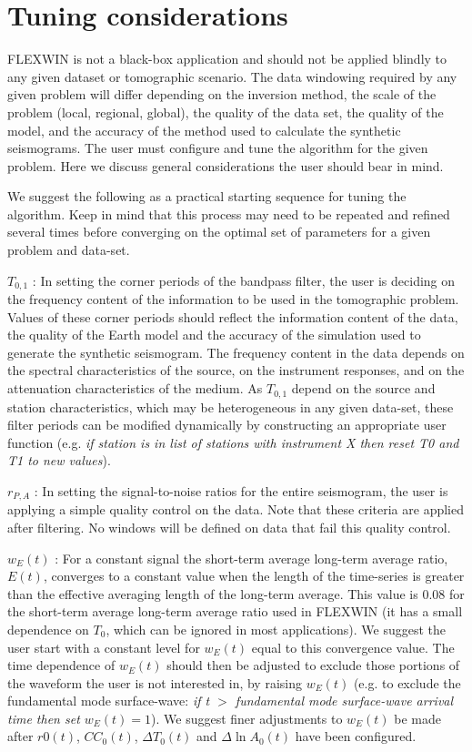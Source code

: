 

\section{Tuning considerations}
FLEXWIN is not a black-box application and should not be applied blindly
to any given dataset or tomographic scenario.  The data windowing required by
any given problem will differ depending on the inversion method, the scale of
the problem (local, regional, global), the quality of the data set, the quality of the model,
and the accuracy of the method used to calculate the synthetic seismograms.  The user
must configure and tune the algorithm for the given problem.  Here we
discuss general considerations the user should bear in mind.

We suggest the following as a practical starting sequence for tuning the algorithm.
Keep in mind that this process may need to be repeated and refined several times before
converging on the optimal set of parameters for a given problem and data-set.

$T_{0,1}$ : In setting the corner periods of the bandpass filter, the
user is deciding on the frequency content of the information to be used in the
tomographic problem.  Values of these corner periods should reflect the
information content of the data, the quality of the Earth model and the
accuracy of the simulation used to generate the synthetic seismogram.  The
frequency content in the data depends on the spectral characteristics of the
source, on the instrument responses, and on the attenuation
characteristics of the medium. As $T_{0,1}$ depend on the source and station
characteristics, which may be heterogeneous in any given data-set, these filter
periods can be modified dynamically by constructing an appropriate user
function (e.g. {\em if station is in list of stations with instrument X then
reset T0 and T1 to new values}).

$r_{P,A}$ : In setting the signal-to-noise ratios for the entire seismogram, the
user is applying a simple quality control on the data.  Note that these criteria 
are applied after filtering.  No windows will be defined on data that fail this
quality control.  

$w_E(t)$ : For a constant signal the short-term average long-term average ratio, $E(t)$,
converges to a constant value when
the length of the time-series is greater than the effective averaging length of
the long-term average.  This value is 0.08 for the short-term average long-term average ratio used in FLEXWIN (it has a small dependence on $T_0$, which can be ignored in most applications).  We suggest the user start with a constant
level for $w_E(t)$ equal to this convergence value.  The time dependence of
$w_E(t)$ should then be adjusted to exclude those portions of the waveform the
user is not interested in, by raising $w_E(t)$ (e.g. to exclude the fundamental
mode surface-wave: {\em if t $>$ fundamental mode surface-wave arrival time then set $w_E(t)=1$}).  
We suggest finer adjustments to $w_E(t)$ be made after $r0(t)$,
$CC_0(t)$, $\Delta T_0(t)$ and $\Delta \ln A_0(t)$ have been configured.

